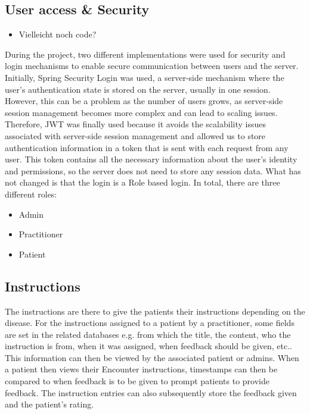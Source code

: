 \documentclass[]{report}
\begin{document}
\subsection{User access \& Security}
\begin{itemize}
    \item Vielleicht noch code?
\end{itemize}
During the project, two different implementations were used for security and login mechanisms to enable secure communication between users and the server. Initially, Spring Security Login was used, a server-side mechanism where the user's authentication state is stored on the server, usually in one session. However, this can be a problem as the number of users grows, as server-side session management becomes more complex and can lead to scaling issues. Therefore, JWT was finally used because it avoids the scalability issues associated with server-side session management and allowed us to store authentication information in a token that is sent with each request from any user. This token contains all the necessary information about the user's identity and permissions, so the server does not need to store any session data. What has not changed is that the login is a Role based login. In total, there are three different roles:
\begin{itemize}
    \item Admin
    \item Practitioner
    \item Patient
\end{itemize}

\subsection{Instructions}
The instructions are there to give the patients their instructions depending on the disease. For the instructions assigned to a patient by a practitioner, some fields are set in the related databases e.g. from which the title, the content, who the instruction is from, when it was assigned, when feedback should be given, etc.. This information can then be viewed by the associated patient or admins. When a patient then views their Encounter instructions, timestamps can then be compared to when feedback is to be given to prompt patients to provide feedback. The instruction entries can also subsequently store the feedback given and the patient's rating.
\end{document}
